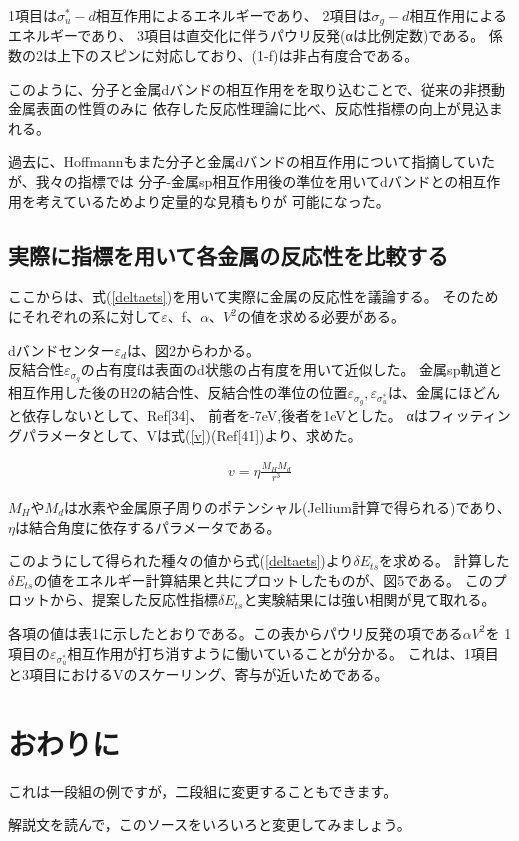 \documentclass[12pt]{ltjsarticle}
\begin{document}
1項目は$\sigma _u ^* -d$相互作用によるエネルギーであり、
2項目は$\sigma _g -d$相互作用によるエネルギーであり、
3項目は直交化に伴うパウリ反発(αは比例定数)である。
係数の2は上下のスピンに対応しており、(1-f)は非占有度合である。

このように、分子と金属dバンドの相互作用をを取り込むことで、従来の非摂動金属表面の性質のみに
依存した反応性理論に比べ、反応性指標の向上が見込まれる。

過去に、Hoffmannもまた分子と金属dバンドの相互作用について指摘していたが、我々の指標では
分子-金属sp相互作用後の準位を用いてdバンドとの相互作用を考えているためより定量的な見積もりが
可能になった。

\subsection{実際に指標を用いて各金属の反応性を比較する}
ここからは、式(\ref{deltaets})を用いて実際に金属の反応性を議論する。
そのためにそれぞれの系に対して$\varepsilon$、f、$\alpha$、$V^2$の値を求める必要がある。

dバンドセンター$\varepsilon_d$は、図2からわかる。\\
反結合性$\varepsilon _{\sigma_g}$の占有度fは表面のd状態の占有度を用いて近似した。
金属sp軌道と相互作用した後のH2の結合性、反結合性の準位の位置$\varepsilon _{\sigma_g},
\varepsilon _{\sigma_u^*}$は、金属にほどんと依存しないとして、Ref[34]、
前者を-7eV,後者を1eVとした。
αはフィッティングパラメータとして、Vは式(\ref{v})(Ref[41])より、求めた。

\begin{eqnarray}
    \label{v}
    v = \eta \frac{ M_H M_d }{r^3}
\end{eqnarray}

$M_H$や$M_d$は水素や金属原子周りのポテンシャル(Jellium計算で得られる)であり、
$\eta$は結合角度に依存するパラメータである。

このようにして得られた種々の値から式(\ref{deltaets})より$\delta E_{ts}$を求める。
計算した$\delta E_{ts}$の値をエネルギー計算結果と共にプロットしたものが、図5である。
このプロットから、提案した反応性指標$\delta E_{ts}$と実験結果には強い相関が見て取れる。

各項の値は表1に示したとおりである。この表からパウリ反発の項である$\alpha V^2$を
1項目の$\varepsilon _{\sigma_u^*}$相互作用が打ち消すように働いていることが分かる。
これは、1項目と3項目におけるVのスケーリング、寄与が近いためである。


\section{おわりに}

これは一段組の例ですが，二段組に変更することもできます。

解説文を読んで，このソースをいろいろと変更してみましょう。
\end{document}
